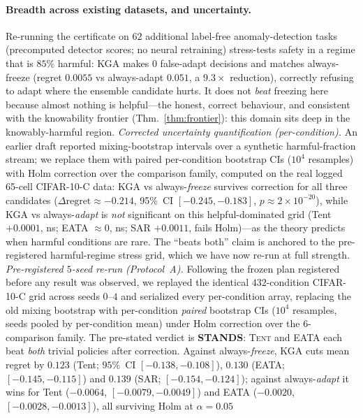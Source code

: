 \documentclass[conference]{IEEEtran}
\theoremstyle{plain}
\theoremstyle{definition}
\begin{document}
\paragraph{Breadth across existing datasets, and uncertainty.} Re-running the certificate on
$62$ additional label-free anomaly-detection tasks (precomputed detector scores; no neural
retraining) stress-tests safety in a regime that is $85\%$ harmful: \textsc{KGA} makes $0$
false-adapt decisions and matches always-freeze (regret $0.0055$ vs always-adapt $0.051$, a
$9.3\times$ reduction), correctly refusing to adapt where the ensemble candidate hurts. It does
not \emph{beat} freezing here because almost nothing is helpful---the honest, correct behaviour,
and consistent with the knowability frontier (Thm.~\ref{thm:frontier}): this domain sits deep in the
knowably-harmful region. \emph{Corrected uncertainty quantification (per-condition).} An
earlier draft reported mixing-bootstrap intervals over a synthetic harmful-fraction
stream; we replace them with paired per-condition bootstrap CIs ($10^4$ resamples) with
Holm correction over the comparison family, computed on the real logged 65-cell
CIFAR-10-C data: \textsc{KGA} vs always-\emph{freeze} survives correction for all three
candidates ($\Delta\mathrm{regret}\approx-0.214$, 95\%~CI $[-0.245,-0.183]$,
$p\approx2\times10^{-20}$), while \textsc{KGA} vs always-\emph{adapt} is \emph{not}
significant on this helpful-dominated grid (Tent $+0.0001$, ns; EATA $\approx0$, ns;
SAR $+0.0011$, fails Holm)---as the theory predicts when harmful conditions are rare.
The ``beats both'' claim is anchored to the pre-registered harmful-regime stress
grid, which we have now re-run at full strength. \emph{Pre-registered $5$-seed
re-run (Protocol~A).} Following the frozen plan registered
before any result was observed, we replayed the identical $432$-condition CIFAR-10-C
grid across seeds $0$--$4$ and serialized every per-condition array, replacing the
old mixing bootstrap with per-condition \emph{paired} bootstrap CIs ($10^4$ resamples,
seeds pooled by per-condition mean) under Holm correction over the $6$-comparison
family. The pre-stated verdict is \textbf{STANDS}: \textsc{Tent} and \textsc{EATA}
each beat \emph{both} trivial policies after correction. Against always-\emph{freeze},
\textsc{KGA} cuts mean regret by $0.123$ (Tent; $95\%$~CI $[-0.138,-0.108]$),
$0.130$ (EATA; $[-0.145,-0.115]$) and $0.139$ (SAR; $[-0.154,-0.124]$); against
always-\emph{adapt} it wins for Tent ($-0.0064$, $[-0.0079,-0.0049]$) and EATA
($-0.0020$, $[-0.0028,-0.0013]$), all surviving Holm at $\alpha{=}0.05$
\end{document}
